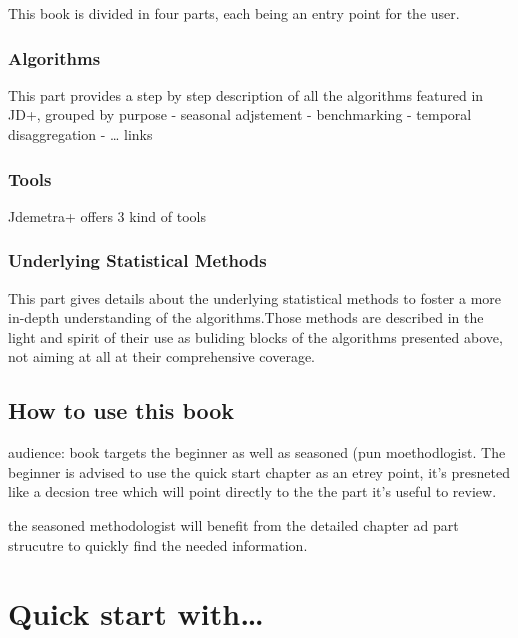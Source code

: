\documentclass[
  letterpaper,
  DIV=11,
  numbers=noendperiod]{scrreprt}
\begin{document}
This book is divided in four parts, each being an entry point for the
user.

\hypertarget{algorithms}{%
\subsection{Algorithms}\label{algorithms}}

This part provides a step by step description of all the algorithms
featured in JD+, grouped by purpose - seasonal adjstement - benchmarking
- temporal disaggregation - \ldots{} links

\hypertarget{tools}{%
\subsection{Tools}\label{tools}}

Jdemetra+ offers 3 kind of tools

\hypertarget{underlying-statistical-methods}{%
\subsection{Underlying Statistical
Methods}\label{underlying-statistical-methods}}

This part gives details about the underlying statistical methods to
foster a more in-depth understanding of the algorithms.Those methods are
described in the light and spirit of their use as buliding blocks of the
algorithms presented above, not aiming at all at their comprehensive
coverage.

\hypertarget{how-to-use-this-book}{%
\section{How to use this book}\label{how-to-use-this-book}}

audience: book targets the beginner as well as seasoned (pun
moethodlogist. The beginner is advised to use the quick start chapter as
an etrey point, it's presneted like a decsion tree which will point
directly to the the part it's useful to review.

the seasoned methodologist will benefit from the detailed chapter ad
part strucutre to quickly find the needed information.

\hypertarget{quick-start-with}{%
\chapter{Quick start with\ldots{}}\label{quick-start-with}}
\end{document}
